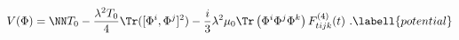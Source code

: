 \begin{equation}
V(\Phi)=\NN T_0-{\lambda^2T_0\over4}\Tr([\Phi^i,\Phi^j]^2)
-{i\over3}\lambda^2\mu_0\Tr\left(\Phi^i\Phi^j\Phi^k\right)
F^{(4)}_{tijk}(t)\ .
\labell{potential}
\end{equation}

